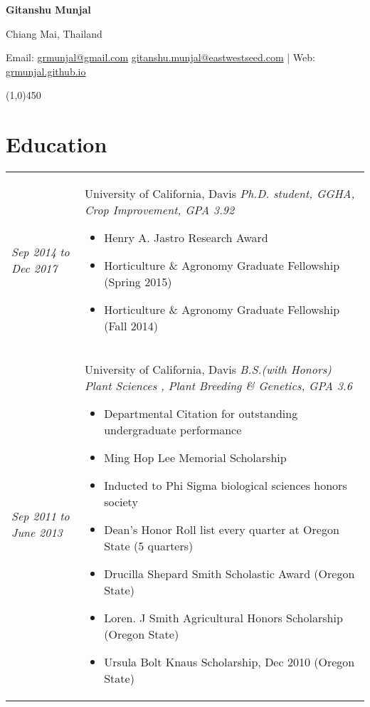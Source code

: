 ﻿\documentclass[a4paper]{article}
\def\name{Gitanshu Munjal}
\begin{document}
\centerline{\huge \bf \name}
\vspace{0.07in}
\centerline{Chiang Mai, Thailand}
\centerline{Email: \href{mailto:grmunjal@gmail.com}{grmunjal@gmail.com}  
\href{mailto:gitanshu.munjal@eastwestseed.com}{gitanshu.munjal@eastwestseed.com}  |  Web: \href{http://grmunjal.github.io/}{grmunjal.github.io}}

\begin{center}
\line(1,0){450}
\end{center}


\section*{Education}
\begin{tabular}{p{3cm} p{14cm}}
\vspace{0pt} 
\textit{Sep 2014}\newline
\textit{to}\newline
\textit{Dec 2017}\newline
& 
\vspace{0pt}
{\Large University of California, Davis}\newline
\textit{Ph.D. student, GGHA, Crop Improvement, GPA 3.92}
\begin{itemize}[noitemsep,topsep=0pt]
  \item Henry A. Jastro Research Award 
  \item Horticulture \& Agronomy Graduate Fellowship (Spring 2015)
  \item Horticulture \& Agronomy Graduate Fellowship (Fall 2014)
\end{itemize}
%
\\
%
\vspace{0pt} 
\textit{Sep 2011}\newline
\textit{to}\newline
\textit{June 2013}\newline
& 
\vspace{0pt}
{\Large University of California, Davis}\newline
\textit{B.S.(with Honors) Plant Sciences , Plant Breeding \& Genetics, GPA 3.6}
\begin{itemize}[noitemsep,topsep=0pt]
  \item Departmental Citation for outstanding undergraduate performance
  \item Ming Hop Lee Memorial Scholarship
  \item Inducted to Phi Sigma biological sciences honors society
  \item Dean's Honor Roll list every quarter at Oregon State (5 quarters)
  \item Drucilla Shepard Smith Scholastic Award (Oregon State)
  \item Loren. J Smith Agricultural Honors Scholarship (Oregon State)
  \item Ursula Bolt Knaus Scholarship, Dec 2010 (Oregon State)
\end{itemize}
\end{tabular}
\end{document}
